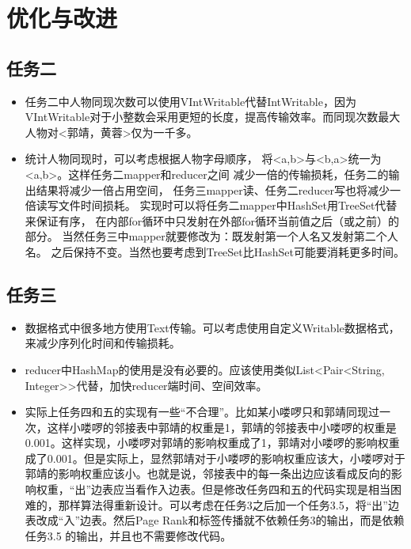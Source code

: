 \documentclass[a4paper,UTF8]{article}
\numberwithin{equation}{section}
\begin{document}
\section{优化与改进}
\subsection{任务二}
\begin{itemize}

    \item 任务二中人物同现次数可以使用VIntWritable代替IntWritable，因为VIntWritable对于小整数会采用更短的长度，提高传输效率。而同现次数最大人物对<郭靖，黄蓉>仅为一千多。
    \item 统计人物同现时，可以考虑根据人物字母顺序，
    将<a,b>与<b,a>统一为<a,b>。这样任务二mapper和reducer之间
    减少一倍的传输损耗，任务二的输出结果将减少一倍占用空间，
    任务三mapper读、任务二reducer写也将减少一倍读写文件时间损耗。
    实现时可以将任务二mapper中HashSet用TreeSet代替来保证有序，
    在内部for循环中只发射在外部for循环当前值之后（或之前）的部分。
    当然任务三中mapper就要修改为：既发射第一个人名又发射第二个人名。
    之后保持不变。当然也要考虑到TreeSet比HashSet可能要消耗更多时间。
\end{itemize}

\subsection{任务三}
\begin{itemize}
	\item 数据格式中很多地方使用Text传输。可以考虑使用自定义Writable数据格式，来减少序列化时间和传输损耗。
	\item reducer中HashMap的使用是没有必要的。应该使用类似List<Pair<String, Integer>>代替，加快reducer端时间、空间效率。
	\item 实际上任务四和五的实现有一些“不合理”。比如某小喽啰只和郭靖同现过一次，这样小喽啰的邻接表中郭靖的权重是1，郭靖的邻接表中小喽啰的权重是0.001。这样实现，小喽啰对郭靖的影响权重成了1，郭靖对小喽啰的影响权重成了0.001。但是实际上，显然郭靖对于小喽啰的影响权重应该大，小喽啰对于郭靖的影响权重应该小。也就是说，邻接表中的每一条出边应该看成反向的影响权重，“出”边表应当看作入边表。但是修改任务四和五的代码实现是相当困难的，那样算法得重新设计。可以考虑在任务3之后加一个任务3.5，将“出”边表改成“入”边表。然后Page Rank和标签传播就不依赖任务3的输出，而是依赖任务3.5 的输出，并且也不需要修改代码。
	
\end{itemize}
\end{document}
